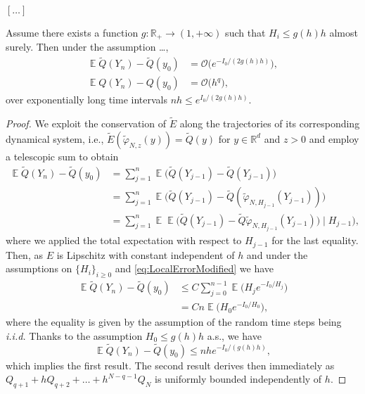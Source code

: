 \documentclass{siamart1116}
\numberwithin{theorem}{section}
\renewcommand{\phi}{\varphi}
\newcommand{\R}{\mathbb{R}}
\newcommand{\OO}{\mathcal{O}}
\newcommand{\E}{\operatorname{\mathbb{E}}}
\begin{document}
$[\ldots]$

\begin{lemma} Assume there exists a function $g\colon \R_+ \to (1, +\infty)$ such that $H_i \leq g(h) h$ almost surely. Then under the assumption \ldots, 
	\begin{align}
		\E \tilde Q(Y_n) - \tilde Q(y_0) &= \OO\big(e^{-I_0/(2g(h)h)}\big), \\
		\E Q(Y_n) - Q(y_0) &= \OO\big(h^q\big),
	\end{align}
	over exponentially long time intervals $nh \leq e^{I_0 / (2g(h)h)}$.
\end{lemma}
\begin{proof} We exploit the conservation of $\tilde E$ along the trajectories of its corresponding dynamical system, i.e., $\tilde E (\tilde \phi_{N,z} (y)) = \tilde Q(y)$ for $y \in \R^d$ and $z > 0$ and employ a telescopic sum to obtain
\begin{equation}
\begin{aligned}
	\E \tilde Q(Y_n) - \tilde Q(y_0) &= \sum_{j=1}^{n} \E\big(\tilde Q(Y_{j-1}) - \tilde Q(Y_{j-1})\big) \\
	&= \sum_{j=1}^{n} \E\big(\tilde Q(Y_{j-1}) - \tilde Q(\tilde\phi_{N, H_{j-1}}(Y_{j-1}))\big) \\
	&= \sum_{j=1}^{n} \E\E\big(\tilde Q(Y_{j-1}) - \tilde Q\tilde\phi_{N, H_{j-1}}(Y_{j-1})) \mid H_{j-1}\big),
\end{aligned}
\end{equation}
where we applied the total expectation with respect to $H_{j-1}$ for the last equality. Then, as $E$ is Lipschitz with constant independent of $h$ and under the assumptions on $\{H_i\}_{i\geq 0}$ and \eqref{eq:LocalErrorModified} we have
\begin{equation}
\begin{aligned}
\E \tilde Q(Y_n) - \tilde Q(y_0) &\leq C \sum_{j=0}^{n-1} \E\big(H_{j}e^{-I_0/H_j}\big)\\
&= C n \E\big(H_0e^{-I_0/H_0}\big),
\end{aligned}
\end{equation}
where the equality is given by the assumption of the random time steps being \textit{i.i.d.} Thanks to the assumption $H_0 \leq g(h)h$ a.s., we have
\begin{equation}
	\E \tilde Q(Y_n) - \tilde Q(y_0) \leq nh e^{-I_0/(g(h)h)},
\end{equation}
which implies the first result. The second result derives then immediately as $Q_{q+1} + h Q_{q+2} + \ldots + h^{N-q-1}Q_N$ is uniformly bounded independently of $h$.
\end{proof}
\end{document}
